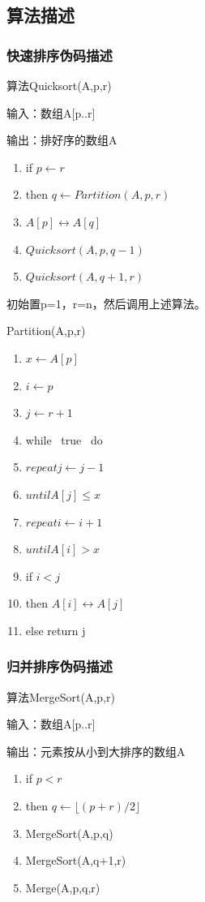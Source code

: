 \documentclass[UTF8]{ctexart}
\begin{document}
\subsection{算法描述}
\subsubsection{快速排序伪码描述}
算法Quicksort(A,p,r)\par
输入：数组A[p..r]\par
输出：排好序的数组A
 \begin{enumerate}
    \item if $p \gets r$
    \item then $q \gets Partition(A,p,r) $
    \item \qquad $A[p] \leftrightarrow A[q] $
    \item \qquad $Quicksort(A,p,q-1) $
    \item \qquad $Quicksort(A,q+1,r) $
\end{enumerate}
\par
初始置p=1，r=n，然后调用上述算法。\par
Partition(A,p,r)
\begin{enumerate}
    \item $x \gets A[p]$
    \item $i \gets p$
    \item $j\gets r+1 $
    \item while \ true \ do
    \item \qquad $repeat j \gets j-1 $
    \item \qquad $until A[j] \le x $
    \item \qquad $repeat i \gets i+1 $
    \item \qquad $until A[i]>x $
    \item \qquad if $i<j $
    \item \qquad then $A[i] \leftrightarrow A[j] $
    \item \qquad else return j
\end{enumerate}
\subsubsection{归并排序伪码描述}
算法MergeSort(A,p,r)\par
输入：数组A[p..r]\par
输出：元素按从小到大排序的数组A\par
\begin{enumerate}
    \item if $p<r$
    \item then $q \gets \lfloor (p+r)/2 \rfloor$
    \item \qquad MergeSort(A,p,q)
    \item \qquad MergeSort(A,q+1,r)
    \item \qquad Merge(A,p,q,r)
\end{enumerate}
\end{document}
